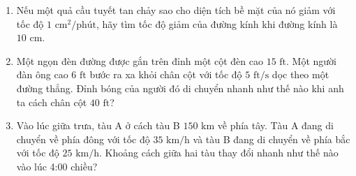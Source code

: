 \begin{minipage}[t]{0.482\textwidth}
\begin{enumerate}[label=\textbf{\arabic*.}, leftmargin=1.35em, itemsep=0.48em, topsep=0.2em, parsep=0pt, start=13]
\item Nếu một quả cầu tuyết tan chảy sao cho diện tích bề mặt của nó giảm với tốc độ $1\text{ cm}^2\text{/phút}$, hãy tìm tốc độ giảm của đường kính khi đường kính là $10\text{ cm}$.

\item Một ngọn đèn đường được gắn trên đỉnh một cột đèn cao $15\text{ ft}$. Một người đàn ông cao $6\text{ ft}$ bước ra xa khỏi chân cột với tốc độ $5\text{ ft/s}$ dọc theo một đường thẳng. Đỉnh bóng của người đó di chuyển nhanh như thế nào khi anh ta cách chân cột $40\text{ ft}$?

\item Vào lúc giữa trưa, tàu A ở cách tàu B $150\text{ km}$ về phía tây. Tàu A đang di chuyển về phía đông với tốc độ $35\text{ km/h}$ và tàu B đang di chuyển về phía bắc với tốc độ $25\text{ km/h}$. Khoảng cách giữa hai tàu thay đổi nhanh như thế nào vào lúc 4:00 chiều?
\end{enumerate}
\end{minipage}

\vfill

\noindent{\color{stewartcyan}\rule{\linewidth}{0.5pt}}
\vspace{0.3em}

